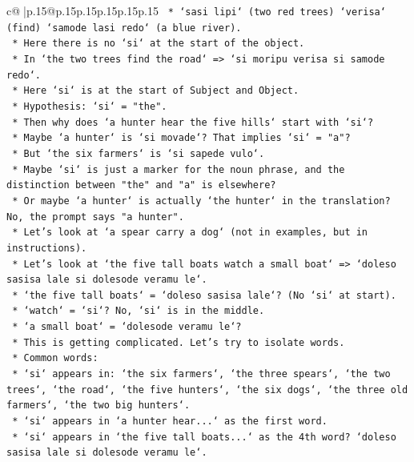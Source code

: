 \documentclass{article}
\begin{document}
{\begin{supertabular}{c@{$\;$}|p{.15\linewidth}@{}p{.15\linewidth}p{.15\linewidth}p{.15\linewidth}p{.15\linewidth}p{.15\linewidth}}
{{{\texttt{            *   `sasi lipi` (two red trees) `verisa` (find) `samode lasi redo` (a blue river).} \\
\texttt{            *   Here there is no `si` at the start of the object.} \\
\texttt{            *   In `the two trees find the road` => `si moripu verisa si samode redo`.} \\
\texttt{            *   Here `si` is at the start of Subject and Object.} \\
\texttt{            *   Hypothesis: `si` = "the".} \\
\texttt{            *   Then why does `a hunter hear the five hills` start with `si`?} \\
\texttt{            *   Maybe `a hunter` is `si movade`? That implies `si` = "a"?} \\
\texttt{            *   But `the six farmers` is `si sapede vulo`.} \\
\texttt{            *   Maybe `si` is just a marker for the noun phrase, and the distinction between "the" and "a" is elsewhere?} \\
\texttt{            *   Or maybe `a hunter` is actually `the hunter` in the translation? No, the prompt says "a hunter".} \\
\texttt{            *   Let's look at `a spear carry a dog` (not in examples, but in instructions).} \\
\texttt{            *   Let's look at `the five tall boats watch a small boat` => `doleso sasisa lale si dolesode veramu le`.} \\
\texttt{            *   `the five tall boats` = `doleso sasisa lale`? (No `si` at start).} \\
\texttt{            *   `watch` = `si`? No, `si` is in the middle.} \\
\texttt{            *   `a small boat` = `dolesode veramu le`?} \\
\texttt{            *   This is getting complicated. Let's try to isolate words.} \\
\texttt{            *   Common words:} \\
\texttt{                *   `si` appears in: `the six farmers`, `the three spears`, `the two trees`, `the road`, `the five hunters`, `the six dogs`, `the three old farmers`, `the two big hunters`.} \\
\texttt{                *   `si` appears in `a hunter hear...` as the first word.} \\
\texttt{                *   `si` appears in `the five tall boats...` as the 4th word? `doleso sasisa lale si dolesode veramu le`.} \\
}}}
\end{supertabular}}
\end{document}
